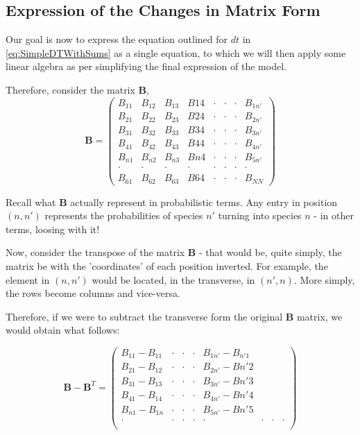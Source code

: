 \documentclass[border=1pt]{article}
\begin{document}
\subsection{Expression of the Changes in Matrix Form}
Our goal is now to express the equation outlined for $dt$ in \autoref{eq:SimpleDTWithSums} as a single equation, to which we will then apply some linear algebra as per simplifying the final expression of the model. 

Therefore, consider the matrix $\mathbf{B}$, 
\begin{equation}
	\mathbf{B}=
	\begin{pmatrix}
		B_{11} & B_{12} & B_{13} & B{14} & \cdot & \cdot & \cdot & B_{1n'}\\
		B_{21} & B_{22} & B_{23} & B{24} & \cdot & \cdot & \cdot & B_{2n'}\\
		B_{31} & B_{32} & B_{33} & B{34} & \cdot & \cdot & \cdot & B_{3n'}\\
		B_{41} & B_{42} & B_{43} & B{44} & \cdot & \cdot & \cdot & B_{4n'}\\
		B_{n1} & B_{n2} & B_{n3} & B{n4} & \cdot & \cdot & \cdot & B_{5n'}\\
		\cdot & \cdot & \cdot & \cdot & \cdot & \cdot & \cdot & \cdot\\
		B_{61} & B_{62} & B_{63} & B{64} & \cdot & \cdot & \cdot & B_{NN}
	\end{pmatrix}
\end{equation}

Recall what $\mathbf{B}$ actually represent in probabilistic terms. Any entry in position $(n, n')$ represents the probabilities of species $n'$ turning into species $n$ - in other terms, loosing with it!

Now, consider the transpose of the matrix $\mathbf{B}$ - that would be, quite simply, the matrix be with the 'coordinates' of each position inverted. For example, the element in $(n, n')$ would be located, in the transverse, in $(n', n)$. More simply, the rows become columns and vice-versa. 

Therefore, if we were to subtract the transverse form the original $\mathbf{B}$ matrix, we would obtain what follows: 

\begin{equation}
	\mathbf{B} - \mathbf{B}^T=
	\begin{pmatrix}
		B_{11}-B_{11} & \cdot & \cdot & \cdot & B_{1n'}-B_{n'1}\\
		B_{21}-B_{12} & \cdot & \cdot & \cdot & B_{2n'}-B{n'2}\\
		B_{31}-B_{13} & \cdot & \cdot & \cdot & B_{3n'}-B{n'3}\\
		B_{41}-B_{14} & \cdot & \cdot & \cdot & B_{4n'}-B{n'4}\\
		B_{n1} - B_{1n} & \cdot & \cdot & \cdot & B_{5n'}-B{n'5}\\
		\cdot & \cdot & \cdot & \cdot & \cdot & \cdot & \cdot & \cdot\\
	\end{pmatrix}
\end{equation}
\end{document}
